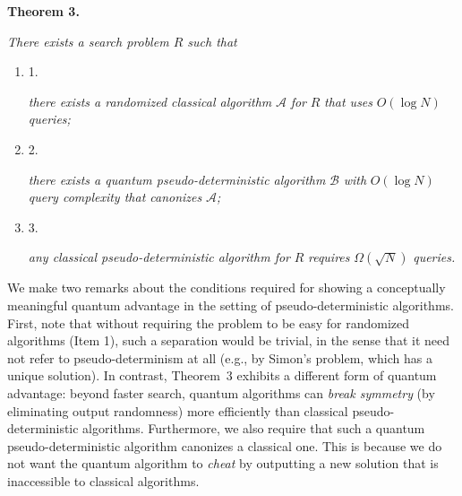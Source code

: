 \documentclass[10pt,a4paper]{article}
\begin{document}


\par\medskip\noindent\textbf{
\textbf{Theorem 3}\textbf{.}
}\par



\emph{There exists a search problem ${R}$ such that}\par


\begin{enumerate}


\item[] 
1. 


\emph{there exists a randomized classical algorithm }$\mathcal{A}$\emph{ for }${R}$\emph{ that uses }$O(\log N)$\emph{ queries;}\par





\item[] 
2. 


\emph{there exists a quantum pseudo-deterministic algorithm }$\mathcal{B}$\emph{ with }$O(\log N)$\emph{ query complexity that canonizes }$\mathcal{A}$\emph{;}\par





\item[] 
3. 


\emph{any classical pseudo-deterministic algorithm for }${R}$\emph{ requires }$\Omega(\sqrt{N})$\emph{ queries.}\par





\end{enumerate}






We make two remarks about the conditions required for showing a conceptually meaningful quantum advantage in the setting of pseudo-deterministic algorithms. First, note that without requiring the problem to be easy for randomized algorithms (Item 1), such a separation would be trivial, in the sense that it need not refer to pseudo-determinism at all (e.g., by Simon’s problem, which has a unique solution). In contrast, Theorem 3 exhibits a different form of quantum advantage: beyond faster search, quantum algorithms can \emph{break symmetry} (by eliminating output randomness) more efficiently than classical pseudo-deterministic algorithms.
Furthermore, we also require that such a quantum pseudo-deterministic algorithm canonizes a classical one. This is because we do not want the quantum algorithm to \emph{cheat} by outputting a new solution that is inaccessible to classical algorithms.\par
\end{document}
